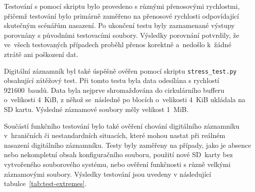 Testování s pomocí skriptu bylo provedeno s různými přenosovými rychlostmi, přičemž
testování bylo primárně zaměřeno na přenosové rychlosti odpovídající skutečným scénářům
nasazení. Po ukončení testu byly zaznamenané výstupy porovnány s původními testovacími
soubory. Výsledky porovnání potvrdily, že ve~všech testovaných případech proběhl přenos
korektně a~nedošlo k~žádné ztrátě ani poškození dat.

Digitální záznamník byl také úspěšně ověřen pomocí skriptu \texttt{stress\_test.py} obsahující zátěžový test. Při tomto testu byla data odesílána s rychlostí 921600~baudů. Data byla nejprve shromažďována do cirkulárního bufferu o~velikosti 4~KiB, z něhož se~následně po blocích o~velikosti 4~KiB ukládala na SD kartu. Výsledné záznamové soubory měly velikost 1~MiB.

Součástí funkčního testování bylo také ověření chování digitálního záznamníku v~hraničních
či nestandardních situacích, které mohou nastat při reálném nasazení digitálního
záznamníku. Testy byly zaměřeny na případy, jako je absence nebo nekompletní obsah konfiguračního
souboru, použití nové SD~karty bez vytvořeného souborového systému, nebo
ověření funkčnosti s různě velkými záznamovými soubory. Výsledky testování jsou uvedeny
v následující tabulce~\ref{tab:test-extremes}.

